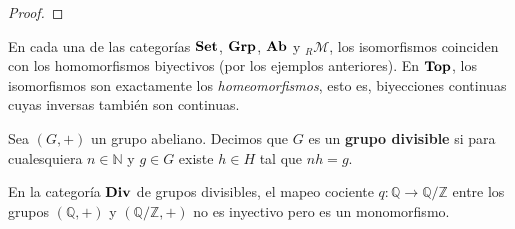 \documentclass[12pt]{report}
\theoremstyle{largebreak}
\newcommand\cf[3]{\ensuremath{#1:#2\rightarrow#3}}
\newcommand{\Cat}[1]{\ensuremath{\textup{\textbf{#1}}}}
\begin{document}
    \begin{proof}
        
    \end{proof}

    \begin{exa}
        En cada una de las categorías $\Cat{Set}$, $\Cat{Grp}$, $\Cat{Ab}$ y $_R\mathcal{M}$, los isomorfismos coinciden con los homomorfismos biyectivos (por los ejemplos anteriores). En $\Cat{Top}$, los isomorfismos son exactamente los \textit{homeomorfismos}, esto es, biyecciones continuas cuyas inversas también son continuas.
    \end{exa}

    \begin{mydef}
        Sea $(G,+)$ un grupo abeliano. Decimos que $G$ es un \textbf{grupo divisible} si para cualesquiera $n\in\mathbb{N}$ y $g\in G$ existe $h\in H$ tal que $nh=g$.
    \end{mydef}

    \begin{exa}
        En la categoría $\Cat{Div}$ de grupos divisibles, el mapeo cociente $\cf{q}{\mathbb{Q}}{\mathbb{Q}/\mathbb{Z}}$ entre los grupos $(\mathbb{Q},+)$ y $(\mathbb{Q}/\mathbb{Z},+)$ no es inyectivo pero es un monomorfismo.
    \end{exa}
\end{document}
